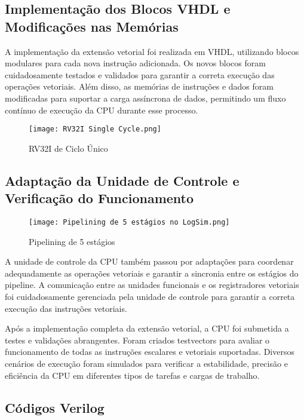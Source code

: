 \documentclass[12pt]{article}
\begin{document}
\subsection{Implementação dos Blocos VHDL e Modificações nas Memórias}


A implementação da extensão vetorial foi realizada em VHDL, utilizando blocos modulares para cada nova instrução adicionada. Os novos blocos foram cuidadosamente testados e validados para garantir a correta execução das operações vetoriais. Além disso, as memórias de instruções e dados foram modificadas para suportar a carga assíncrona de dados, permitindo um fluxo contínuo de execução da CPU durante esse processo.

\begin{figure}[h]
    \centering
    \texttt{[image: RV32I Single Cycle.png]}
    \caption{RV32I de Ciclo Único}
\end{figure}

\subsection{Adaptação da Unidade de Controle e Verificação do Funcionamento}

\newpage
\newpage

\begin{figure}[h]
    \centering
    \texttt{[image: Pipelining de 5 estágios no LogSim.png]}
    \caption{Pipelining de 5 estágios}
\end{figure}

A unidade de controle da CPU também passou por adaptações para coordenar adequadamente as operações vetoriais e garantir a sincronia entre os estágios do pipeline. A comunicação entre as unidades funcionais e os registradores vetoriais foi cuidadosamente gerenciada pela unidade de controle para garantir a correta execução das instruções vetoriais.

Após a implementação completa da extensão vetorial, a CPU foi submetida a testes e validações abrangentes. Foram criados testvectors para avaliar o funcionamento de todas as instruções escalares e vetoriais suportadas. Diversos cenários de execução foram simulados para verificar a estabilidade, precisão e eficiência da CPU em diferentes tipos de tarefas e cargas de trabalho.

\subsection{Códigos Verilog}
\end{document}
